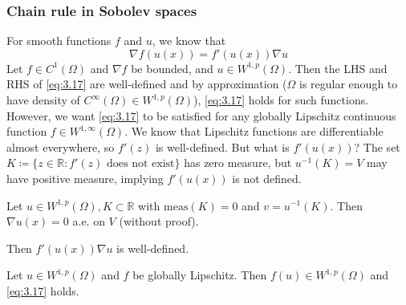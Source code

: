 \documentclass{report}
\begin{document}
\subsubsection*{Chain rule in Sobolev spaces}
For smooth functions \(f\) and \(u\), we know that 
\begin{equation}\label{eq:3.17}
    \nabla f(u(x)) = f'(u(x))\nabla u
\end{equation}
Let \(f \in C^{1}(\Omega)\) and \(\nabla f\) be bounded, and \(u \in W^{1, p}(\Omega)\). Then the LHS and RHS of \ref{eq:3.17} are well-defined and by approximation (\(\Omega\) is regular enough to have density of \(C^{\infty}(\Omega) \in W^{1, p}(\Omega)\)), \ref{eq:3.17} holds for such functions. However, we want \ref{eq:3.17} to be satisfied for any globally Lipschitz continuous function \(f \in W^{1, \infty}(\Omega)\). We know that Lipschitz functions are differentiable almost everywhere, so \(f'(z)\) is well-defined. But what is \(f'(u(x))\)? The set \(K \coloneqq \{z \in \mathbb{R} : f'(z) \text{ does not exist}\}\) has zero measure, but \(u^{-1}(K) = V\) may have positive measure, implying \(f'(u(x))\) is not defined.

\begin{lemma}{}{}
    Let \(u \in W^{1, p}(\Omega), K \subset \mathbb{R}\)  with \(\text{meas}(K) = 0\) and \(v = u^{-1}(K)\). Then \(\nabla u(x) = 0\) a.e. on \(V\) (without proof).
\end{lemma}

Then \(f'(u(x))\nabla u\) is well-defined.

\begin{theorem}{}{}
    Let \(u \in W^{1, p}(\Omega)\) and \(f\) be globally Lipschitz. Then \(f(u) \in W^{1, p}(\Omega)\) and \ref{eq:3.17} holds.
\end{theorem}
\end{document}
